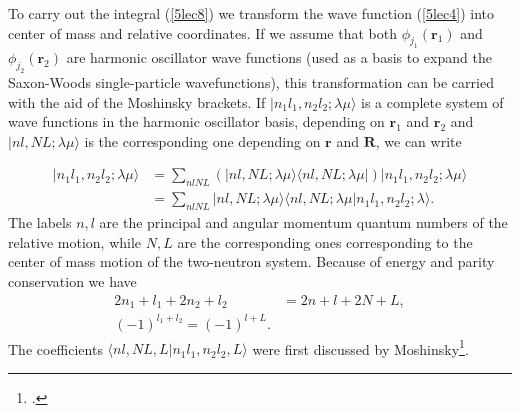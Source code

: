 To carry out the integral (\ref{5lec8}) we transform the wave function (\ref{5lec4}) into center of mass and relative coordinates. If we assume that both $\phi_{j_1}(\mathbf r_1)$ and $\phi_{j_2}(\mathbf r_2)$ are harmonic oscillator wave functions (used as a basis to expand the Saxon-Woods single-particle wavefunctions), this transformation can be carried with the aid of the Moshinsky brackets. If $| n_1 l_1,n_2 l_2; \lambda \mu \rangle$ is a complete system of wave functions in the harmonic oscillator basis, depending on $\mathbf r_1$ and $\mathbf r_2$ and $| n l,N L; \lambda \mu \rangle$ is the corresponding one depending on $\mathbf r$ and  $\mathbf R$, we can write

\begin{equation}\label{5lec9}
\begin{split}
| n_1 l_1,n_2 l_2; \lambda \mu \rangle&= \sum_{n l N L} \left(| n l,N L; \lambda \mu \rangle \langle n l,N L; \lambda \mu |\right)
| n_1 l_1,n_2 l_2; \lambda \mu \rangle \\
&=\sum_{n l N L} | n l,N L; \lambda \mu \rangle \langle n l,N L; \lambda \mu | n_1 l_1,n_2 l_2; \lambda  \rangle.
\end{split}
\end{equation}
The labels $n,l$ are the principal and angular momentum quantum numbers of the relative motion, while $N,L$ are the corresponding ones corresponding to the center of mass motion of the two-neutron system. Because of energy and parity conservation we have
\begin{equation}\label{5lec10}
\begin{split}
2n_1+l_1+2n_2+l_2&=2n+l+2N+L,\\
(-1)^{l_1+l_2}=(-1)^{l+L}.
\end{split}
\end{equation}
The coefficients $\langle n l,N L, L | n_1 l_1,n_2 l_2, L  \rangle$ were first discussed by Moshinsky\footnote{\cite{Moshinsky:59}.}.
	

